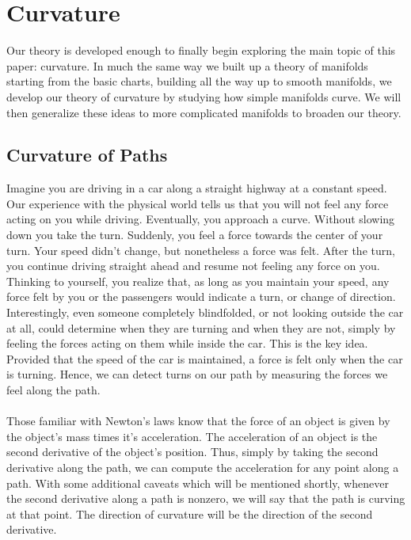 \documentclass[]{article}
\newcommand\<{\ensuremath{\left\langle}}
\renewcommand\>{\ensuremath{\right\rangle}}
\theoremstyle{definition}
\theoremstyle{definition}
\begin{document}
	\newpage
	\section{Curvature}
	Our theory is developed enough to finally begin exploring the main topic of this paper: curvature. In much the same way we built up a theory of manifolds starting from the basic charts, building all the way up to smooth manifolds, we develop our theory of curvature by studying how simple manifolds curve. We will then generalize these ideas to more complicated manifolds to broaden our theory. 
	
	\subsection*{Curvature of Paths}
	Imagine you are driving in a car along a straight highway at a constant speed. Our experience with the physical world tells us that you will not feel any force acting on you while driving. Eventually, you approach a curve. Without slowing down you take the turn. Suddenly, you feel a force towards the center of your turn. Your speed didn't change, but nonetheless a force was felt. After the turn, you continue driving straight ahead and resume not feeling any force on you. Thinking to yourself, you realize that, as long as you maintain your speed, any force felt by you or the passengers would indicate a turn, or change of direction. Interestingly, even someone completely blindfolded, or not looking outside the car at all, could determine when they are turning and when they are not, simply by feeling the forces acting on them while inside the car. This is the key idea. Provided that the speed of the car is maintained, a force is felt only when the car is turning. Hence, we can detect turns on our path by measuring the forces we feel along the path.\\
	\\
	Those familiar with Newton's laws know that the force of an object is given by the object's mass times it's acceleration. The acceleration of an object is the second derivative of the object's position. Thus, simply by taking the second derivative along the path, we can compute the acceleration for any point along a path. With some additional caveats which will be mentioned shortly, whenever the second derivative along a path is nonzero, we will say that the path is curving at that point. The direction of curvature will be the direction of the second derivative.\\
	\\
\end{document}
